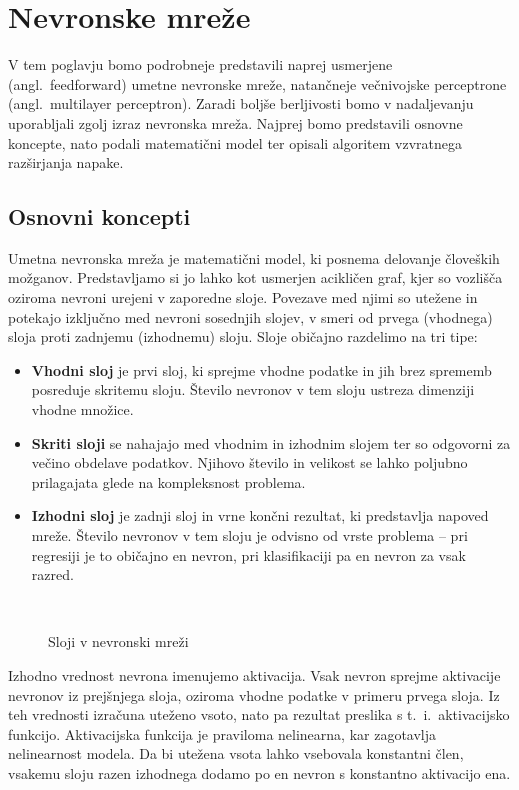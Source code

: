 \chapter{Nevronske mreže}

V tem poglavju bomo podrobneje predstavili naprej usmerjene (angl.\ feedforward) umetne nevronske mreže, natančneje večnivojske perceptrone (angl.\ multilayer perceptron). Zaradi boljše berljivosti bomo v nadaljevanju uporabljali zgolj izraz nevronska mreža. Najprej bomo predstavili osnovne koncepte, nato podali matematični model ter opisali algoritem vzvratnega razširjanja napake.


\section{Osnovni koncepti}

Umetna nevronska mreža je matematični model, ki posnema delovanje človeških možganov. Predstavljamo si jo lahko kot usmerjen acikličen graf, kjer so vozlišča oziroma nevroni urejeni v zaporedne sloje. Povezave med njimi so utežene in potekajo izključno med nevroni sosednjih slojev, v smeri od prvega (vhodnega) sloja proti zadnjemu (izhodnemu) sloju. Sloje običajno razdelimo na tri tipe:
\begin{itemize}
  \item \textbf{Vhodni sloj} je prvi sloj, ki sprejme vhodne podatke in jih brez sprememb posreduje skritemu sloju. Število nevronov v tem sloju ustreza dimenziji vhodne množice.
  \item \textbf{Skriti sloji} se nahajajo med vhodnim in izhodnim slojem ter so odgovorni za večino obdelave podatkov. Njihovo število in velikost se lahko poljubno prilagajata glede na kompleksnost problema.
  \item \textbf{Izhodni sloj} je zadnji sloj in vrne končni rezultat, ki predstavlja napoved mreže. Število nevronov v tem sloju je odvisno od vrste problema – pri regresiji je to običajno en nevron, pri klasifikaciji pa en nevron za vsak razred. 
\end{itemize}

\begin{figure}[H]
  \centering
  
  \caption{Sloji v nevronski mreži}~\label{fig:nn-layers}
\end{figure}

Izhodno vrednost nevrona imenujemo aktivacija. Vsak nevron sprejme aktivacije nevronov iz prejšnjega sloja, oziroma vhodne podatke v primeru prvega sloja. Iz teh vrednosti izračuna uteženo vsoto, nato pa rezultat preslika s t.\  i.\ aktivacijsko funkcijo. Aktivacijska funkcija je praviloma nelinearna, kar zagotavlja nelinearnost modela.
Da bi utežena vsota lahko vsebovala konstantni člen, vsakemu sloju razen izhodnega dodamo po en nevron s konstantno aktivacijo ena.

